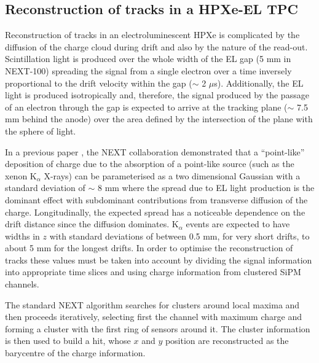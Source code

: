 \documentclass[a4paper,11pt]{article}
\begin{document}
\subsection{Reconstruction of tracks in a HPXe-EL TPC}\label{ssec.reconstruction}
Reconstruction of tracks in an electroluminescent HPXe is complicated by the diffusion of the charge cloud during drift and also by the nature of the read-out. Scintillation light is produced over the whole width of the EL gap (5 mm in NEXT-100) spreading the signal from a single electron over a time inversely proportional to the drift velocity within the gap ($\sim$ 2 $\mu$s). Additionally, the EL light is produced isotropically and, therefore, the signal produced by the passage of an electron through the gap is expected to arrive at the tracking plane ($\sim$ 7.5 mm behind the anode) over the area defined by the intersection of the plane with the sphere of light.

In a previous paper \cite{Lorca:2014sra}, the NEXT collaboration demonstrated that a ``point-like''
deposition of charge due to the absorption of a point-like source (such as the xenon K$_\alpha$ X-rays) can be parameterised as a two dimensional Gaussian with a standard deviation of $\sim$ 8 mm where the spread due to EL light production is the dominant effect with subdominant contributions from transverse diffusion of the charge. Longitudinally, the expected spread has a noticeable dependence on the drift distance since the diffusion dominates. K$_\alpha$ events are expected to have widths in $z$ with standard deviations of between 0.5 mm, for very short drifts, to about 5 mm for the longest drifts. In order to optimise the reconstruction of tracks these values must be taken into account by dividing the signal information into appropriate time slices and using charge information from clustered SiPM channels.

The standard NEXT algorithm searches for clusters around local maxima and then proceeds iteratively, selecting first the channel with maximum charge and forming a cluster with the first ring of sensors around it. The cluster information is then used to build a hit, whose $x$ and $y$ position are reconstructed as the barycentre of the charge information. 
\end{document}
